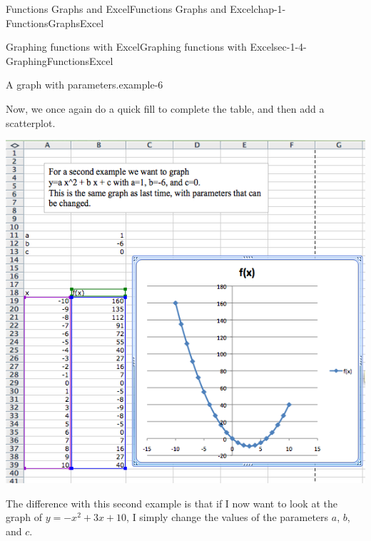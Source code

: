 \documentclass[oneside,10pt,]{book}
\numberwithin{equation}{section}
\begin{document}
\begin{chapterptx}{Functions Graphs and Excel}{}{Functions Graphs and Excel}{}{}{chap-1-FunctionsGraphsExcel}
\begin{sectionptx}{Graphing functions with Excel}{}{Graphing functions with Excel}{}{}{sec-1-4-GraphingFunctionsExcel}
\begin{example}{A graph with parameters.}{example-6}
\begin{sidebyside}{1}{0.1}{0.1}{0}
\begin{sbspanel}{0.8}
\end{sbspanel}%
\end{sidebyside}%
\par
\hypertarget{p-325}{}%
Now, we once again do a quick fill to complete the table, and then add a scatterplot.%
\begin{sidebyside}{1}{0.1}{0.1}{0}%
\begin{sbspanel}{0.8}%
\includegraphics[width=1\linewidth]{images/sec1-4-6.png}
\end{sbspanel}%
\end{sidebyside}%
\par
\hypertarget{p-326}{}%
The difference with this second example is that if I now want to look at the graph of \(y = -x^2 + 3 x + 10\), I simply change the values of the parameters \(a\), \(b\), and \(c\).%
\begin{sidebyside}{1}{0.1}{0.1}{0}%
\begin{sbspanel}{0.8}%

\end{sbspanel}
\end{sidebyside}
\end{example}
\end{sectionptx}
\end{chapterptx}
\end{document}
